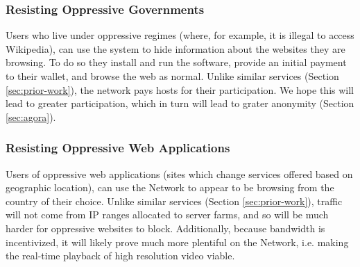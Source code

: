 \subsubsection{Resisting Oppressive Governments}

Users who live under oppressive regimes (where, for example, it is illegal to access Wikipedia), can use the system to hide information about the websites they are browsing. To do so they install and run the \Orchid{} software, provide an initial payment to their \Orchid{} wallet, and browse the web as normal. Unlike similar services (Section \ref{sec:prior-work}), the network pays hosts for their participation. We hope this will lead to greater participation, which in turn will lead to grater anonymity (Section \ref{sec:agora}).

\subsubsection{Resisting Oppressive Web Applications}

Users of oppressive web applications (sites which change services offered based on geographic location), can use the \Orchid{} Network to appear to be browsing from the country of their choice. Unlike similar services (Section \ref{sec:prior-work}), traffic will not come from IP ranges allocated to server farms, and so will be much harder for oppressive websites to block. Additionally, because bandwidth is incentivized, it will likely prove much more plentiful on the \Orchid{} Network, i.e. making the real-time playback of high resolution video viable.

